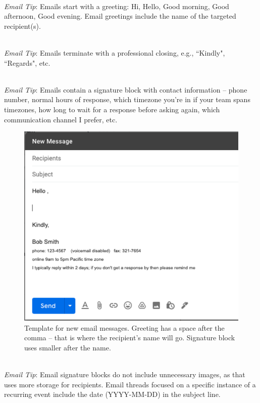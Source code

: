 \ \\
\textit{Email Tip}: Emails start with a greeting: Hi, Hello, Good morning, Good afternoon, Good evening. 
Email greetings include the name of the targeted recipient(s). 

\ \\
\textit{Email Tip}: Emails terminate with a professional closing, e.g., ``Kindly", ``Regards", etc.

\ \\
\textit{Email Tip}: Emails contain a signature block with contact information -- phone number, normal hours of response, which timezone you're in if your team spans timezones, how long to wait for a response before asking again, which communication channel I prefer, etc.

\begin{figure}
\includegraphics[width=1\textwidth]{images/email_template.pdf}
\caption{Template for new email messages. Greeting has a space after the comma -- that is where the recipient's name will go. Signature block uses smaller after the name.}
\label{fig:email_template}
\end{figure}

\ \\
\textit{Email Tip}: Email signature blocks do not include unnecessary images, as that uses more storage for recipients. 
Email threads focused on a specific instance of a recurring event include the date (YYYY-MM-DD) in the subject line. 

